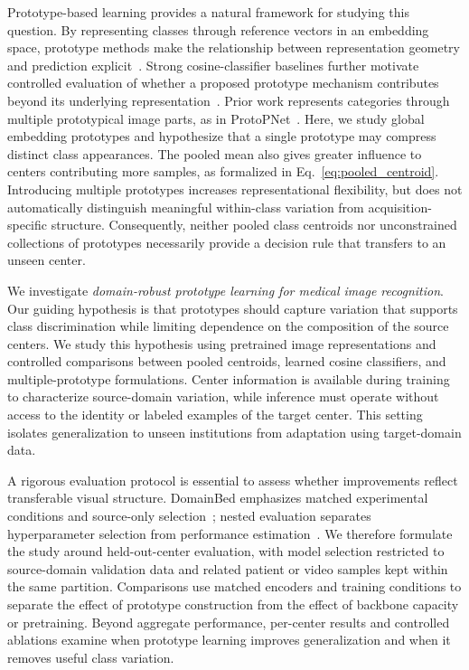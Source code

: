 Prototype-based learning provides a natural framework for studying this question. By representing classes through reference vectors in an embedding space, prototype methods make the relationship between representation geometry and prediction explicit~\cite{snell2017prototypical}. Strong cosine-classifier baselines further motivate controlled evaluation of whether a proposed prototype mechanism contributes beyond its underlying representation~\cite{chen2019closer}. Prior work represents categories through multiple prototypical image parts, as in ProtoPNet~\cite{chen2019protopnet}. Here, we study global embedding prototypes and hypothesize that a single prototype may compress distinct class appearances. The pooled mean also gives greater influence to centers contributing more samples, as formalized in Eq.~\ref{eq:pooled_centroid}. Introducing multiple prototypes increases representational flexibility, but does not automatically distinguish meaningful within-class variation from acquisition-specific structure. Consequently, neither pooled class centroids nor unconstrained collections of prototypes necessarily provide a decision rule that transfers to an unseen center.

We investigate \emph{domain-robust prototype learning for medical image recognition}. Our guiding hypothesis is that prototypes should capture variation that supports class discrimination while limiting dependence on the composition of the source centers. We study this hypothesis using pretrained image representations and controlled comparisons between pooled centroids, learned cosine classifiers, and multiple-prototype formulations. Center information is available during training to characterize source-domain variation, while inference must operate without access to the identity or labeled examples of the target center. This setting isolates generalization to unseen institutions from adaptation using target-domain data.

A rigorous evaluation protocol is essential to assess whether improvements reflect transferable visual structure. DomainBed emphasizes matched experimental conditions and source-only selection~\cite{gulrajani2021domainbed}; nested evaluation separates hyperparameter selection from performance estimation~\cite{varma2006bias}. We therefore formulate the study around held-out-center evaluation, with model selection restricted to source-domain validation data and related patient or video samples kept within the same partition. Comparisons use matched encoders and training conditions to separate the effect of prototype construction from the effect of backbone capacity or pretraining. Beyond aggregate performance, per-center results and controlled ablations examine when prototype learning improves generalization and when it removes useful class variation.

